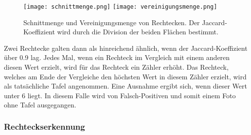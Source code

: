 \begin{figure}[h!]
\texttt{[image: schnittmenge.png]}
\texttt{[image: vereinigungsmenge.png]}
\caption{Schnittmenge und Vereinigungsmenge von Rechtecken. Der Jaccard-Koeffizient wird durch die Division der beiden Flächen bestimmt.}
\label{fig:jaccard}
\end{figure}

Zwei Rechtecke galten dann als hinreichend ähnlich, wenn der Jaccard-Koeffizient über 0.9 lag. Jedes Mal, wenn ein Rechteck im Vergleich mit einem anderen diesen Wert erzielt, wird für das Rechteck ein Zähler erhöht. Das Rechteck, welches am Ende der Vergleiche den höchsten Wert in diesem Zähler erzielt, wird als tatsächliche Tafel angenommen. Eine Ausnahme ergibt sich, wenn dieser Wert unter 6 liegt. In diesem Falle wird von Falsch-Positiven und somit einem Foto ohne Tafel ausgegangen. %

\subsubsection*{Rechteckserkennung}

